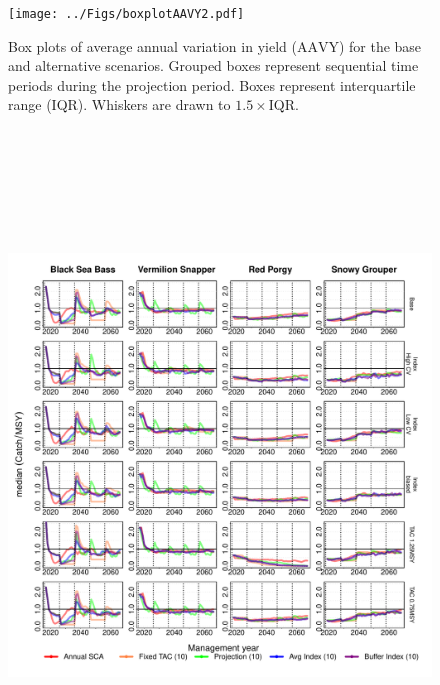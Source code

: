 \documentclass[12pt,english]{article}
\begin{document}
\begin{appendix}
\begin{figure}[!ht]
\end{figure}
\clearpage\begin{figure}[!ht]
\begin{center}
\texttt{[image: ../Figs/boxplotAAVY2.pdf]}
\end{center}
\begin{flushleft}
\caption{Box plots of average annual variation in yield ($\mathrm{AAVY}$) for the base and alternative scenarios. Grouped boxes represent sequential time periods during the projection period. Boxes represent interquartile range (IQR). Whiskers are drawn to $1.5\times\mathrm{IQR}$.}
\label{fig:boxplotAAVY2}
\end{flushleft}
\end{figure}
\clearpage
\begin{figure}[!ht]
\begin{center}
\includegraphics[width=6in, height=7in]{../Figs/tsCatchMSY2.pdf}
\end{center}
\begin{flushleft}

\end{flushleft}
\end{figure}
\end{appendix}
\end{document}
